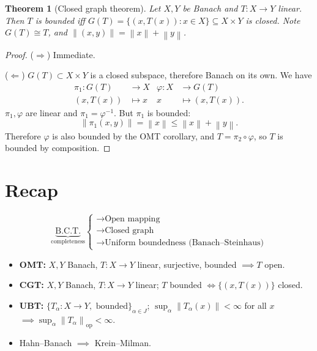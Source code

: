 \documentclass[12pt]{article}
\newcommand{\norm}[1]{\left\| #1 \right\|}
\newtheorem{thm}{Theorem}[section]
\theoremstyle{definition}
\begin{document}
\begin{thm}[Closed graph theorem]
	Let $X, Y$ be Banach and $T : X \to Y$ linear.
	Then $T$ is bounded iff $G(T) = \lbrace (x, T(x)) : x \in X \rbrace \subseteq X \times Y$ is closed.
	Note $G(T) \cong T$, and $\norm{(x,y)} = \norm{x} + \norm{y}$.
\end{thm}
\begin{proof}
	($\Rightarrow$) Immediate.

	($\Leftarrow$) $G(T) \subset X \times Y$ is a closed subspace, therefore Banach on its own.
	We have
	\begin{align*}
		\pi_1 : G(T) &\to X & \varphi : X &\to G(T) \\
		(x, T(x)) &\mapsto x & x &\mapsto (x, T(x)).
	\end{align*}
	$\pi_1, \varphi$ are linear and $\pi_1 = \varphi^{-1}$.
	But $\pi_1$ is bounded:
	\begin{equation*}
		\norm{\pi_1(x,y)} = \norm{x} \leq \norm{x} + \norm{y}.
	\end{equation*}
	Therefore $\varphi$ is also bounded by the OMT corollary, and $T = \pi_2 \circ \varphi$, so $T$ is bounded by composition.
\end{proof}

\section{Recap}

\begin{equation*}
	\underbrace{\text{B.C.T.}}_{\text{completeness}}
	\begin{cases}
		\longrightarrow \text{Open mapping} \\
		\longrightarrow \text{Closed graph} \\
		\longrightarrow \text{Uniform boundedness (Banach--Steinhaus)}
	\end{cases}
\end{equation*}

\begin{itemize}
	\item \textbf{OMT: } $X, Y$ Banach, $T : X \to Y$ linear, surjective, bounded $\implies T$ open.
	\item \textbf{CGT: } $X, Y$ Banach, $T : X \to Y$ linear; $T$ bounded $\iff \lbrace (x, T(x)) \rbrace$ closed.
	\item \textbf{UBT: } $\lbrace T_\alpha : X \to Y, \text{ bounded} \rbrace_{\alpha \in J}$; $\sup_\alpha \norm{T_\alpha(x)} < \infty$ for all $x$ $\implies \sup_\alpha \norm{T_\alpha}_{\mathrm{op}} < \infty$.
	\item Hahn--Banach $\implies$ Krein--Milman.
\end{itemize}
\end{document}
